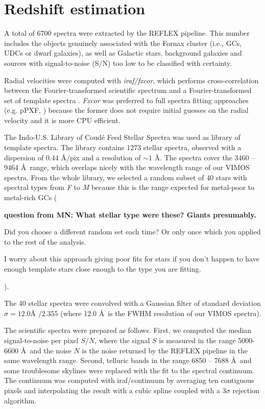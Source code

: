 \documentclass[useAMS,usenatbib]{mn2e}
\begin{document}
\section{Redshift estimation}
\label{sec:zest}

A total of 6700 spectra were extracted by the REFLEX pipeline. This number includes the objects genuinely associated with the Fornax cluster (i.e., GCs, UDCs or dwarf galaxies), as well as Galactic stars, background galaxies and sources with signal-to-noise (S$/$N) too low to be classified with certainty. 

Radial velocities were computed with {\it iraf/fxcor}, which performs cross-correlation between the Fourier-transformed scientific spectrum and a Fourier-transformed set of template spectra \citep{Tonry79}. {\it Fxcor} was preferred to full spectra fitting approaches (e.g. pPXF, \citealt{Cappellari04}) because the former does not require initial guesses on the radial velocity and it is more CPU efficient. 

The Indo-U.S. Library of Coud\'e Feed Stellar Spectra \citep{Valdes04} was used as library of template spectra. The library contains 1273 stellar spectra, observed with a dispersion of $0.44$ \AA /pix and a resolution of $\sim 1$ \AA . The spectra cover the 3460 -- 9464 \AA\ range, which overlaps nicely with the wavelength range of our VIMOS spectra. From the whole library, we selected a random subset of 40 stars with spectral types from \textit{F} to \textit{M} because this is the range expected for metal-poor to metal-rich GCs ({\bf question from MN: What stellar type were these? Giants presumably.

Did you choose a different random set each time? Or only once which you applied to the rest of the analysis.

I worry about this approach giving poor fits for stars if you don’t happen to have enough template stars close enough to the type you are fitting.
}). 


The 40 stellar spectra were convolved with a Gaussian filter of standard deviation $\sigma = 12.0\mbox{\AA\ } / 2.355$ (where 12.0 \AA\ is the FWHM resolution of our VIMOS spectra). 

The scientific spectra were prepared as follows. First, we computed the median signal-to-noise per pixel $S/N$, where the signal $S$ is measured in the range 5000-6600 \AA\ and the noise $N$ is the noise returned by the REFLEX pipeline in the same wavelength range. Second, telluric bands in the range 6850 -- 7688 \AA\ and some troublesome skylines were replaced with the fit to the spectral continuum. The continuum was computed with iraf/continuum by averaging ten contiguous pixels and interpolating the result with a cubic spline coupled with a $3\sigma$ rejection algorithm.  
\end{document}
